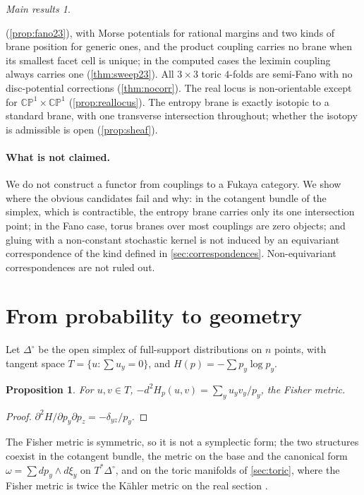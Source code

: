 \documentclass[11pt]{article}
\newtheorem{proposition}[theorem]{Proposition}
\theoremstyle{definition}
\theoremstyle{remark}
\newtheorem*{mainthm}{Main results}
\begin{document}
\begin{mainthm}
\begin{enumerate}[label=(\Alph*),leftmargin=*]
  (\cref{prop:fano23}), with Morse potentials for rational margins and two kinds of brane position for generic ones, and the product coupling
  carries no brane when its smallest facet cell is unique; in the computed cases the leximin coupling always carries one (\cref{thm:sweep23}). All $3\times3$ toric $4$-folds are
  semi-Fano with no disc-potential corrections (\cref{thm:nocorr}). The real locus is non-orientable except for $\mathbb{CP}^1\times\mathbb{CP}^1$
  (\cref{prop:reallocus}). The entropy brane is exactly isotopic to a standard brane, with one transverse intersection throughout; whether the
  isotopy is admissible is open (\cref{prop:sheaf}).
\end{enumerate}
\end{mainthm}

\paragraph{What is not claimed.} We do not construct a functor from couplings to a Fukaya category. We show where the obvious
candidates fail and why: in the cotangent bundle of the simplex, which is contractible, the entropy brane carries only its one
intersection point; in the Fano case, torus branes over most couplings are zero objects; and gluing with a non-constant
stochastic kernel is not induced by an equivariant correspondence of the kind defined in \cref{sec:correspondences}.
Non-equivariant correspondences are not ruled out.

\section{From probability to geometry}\label{sec:geometry}

Let $\Delta^\circ$ be the open simplex of full-support distributions on $n$ points, with tangent space
$T=\{u:\sum u_y=0\}$, and $H(p)=-\sum p_y\log p_y$.

\begin{proposition}\label{prop:fisher}
For $u,v\in T$, $-d^2H_p(u,v)=\sum_yu_yv_y/p_y$, the Fisher metric.
\end{proposition}
\begin{proof}
$\partial^2H/\partial p_y\partial p_z=-\delta_{yz}/p_y$.
\end{proof}

The Fisher metric is symmetric, so it is not a symplectic form; the two structures coexist in the cotangent bundle, the
metric on the base and the canonical form $\omega=\sum dp_y\wedge d\xi_y$ on $T^*\Delta^\circ$, and on the toric manifolds of
\cref{sec:toric}, where the Fisher metric is twice the Kähler metric on the real section \cite[Prop.~6.5]{Conditionals}.
\end{document}
